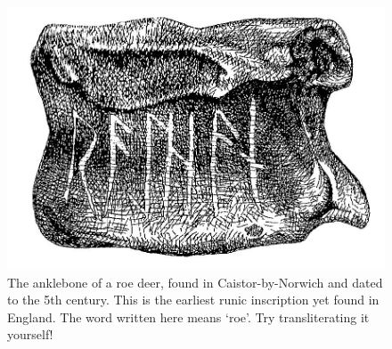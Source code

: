 \begin{figure}
        \includegraphics[scale=0.5]{chapters/img/runic-inscription.jpg}
    \caption{The anklebone of a roe deer, found in Caistor-by-Norwich and dated to the 5th century. This is the earliest runic inscription yet found in England. The word written here means `roe'. Try transliterating it yourself!}
    \label{fig:anklebone_runic_inscription}
\end{figure}


